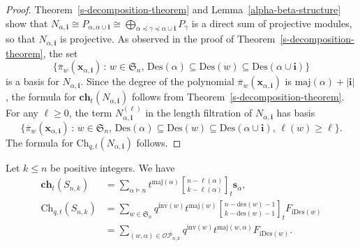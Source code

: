 \documentclass[ALCO,ThmDefs,published]{cedram}
\newcommand{\symm}{{\mathfrak{S}}}
\newcommand{\xx}{{\mathbf {x}}}
\theoremstyle{plain}
\newcommand{\maj}{{\mathrm {maj}}}
\newcommand{\inv}{{\mathrm {inv}}}
\newcommand{\Des}{{\mathrm {Des}}}
\newcommand{\des}{{\mathrm {des}}}
\newcommand{\Ch}{{\mathrm {Ch}}}
\newcommand{\ch}{{\mathbf {ch}}}
\newcommand{\iDes}{{\mathrm {iDes}}}
\newcommand{\symm}{{\mathfrak{S}}}
\newcommand{\OP}{{\mathcal{OP}}}
\newcommand{\xx}{{\mathbf {x}}}
\newcommand{\ii}{{\mathbf{i}}}
\newcommand{\sss}{{\mathbf{s}}}
\newcommand{\pib}{\overline{\pi}}
\begin{document}
\begin{proof}
Theorem~\ref{s-decomposition-theorem} and Lemma~\ref{alpha-beta-structure} show that 
$N_{\alpha,\ii} \cong P_{\alpha, \alpha \cup \ii} \cong \bigoplus_{\alpha \preceq \gamma \preceq \alpha \cup \ii} P_{\gamma}$
is a direct sum of projective modules, so that $N_{\alpha,\ii}$ is projective.
As observed in the proof of Theorem~\ref{s-decomposition-theorem},
the set 
\begin{equation*}
\{ \pib_w(\xx_{\alpha,\ii}) \,:\, w \in \symm_n, \, \Des(\alpha) \subseteq \Des(w) 
\subseteq \Des(\alpha \cup \ii) \}
\end{equation*}
is a basis for $N_{\alpha,\ii}$.  Since the degree of the polynomial $\pib_w(\xx_{\alpha,\ii})$
is $\maj(\alpha) + |\ii|$, the formula for $\ch_t(N_{\alpha,\ii})$ follows from 
Theorem~\ref{s-decomposition-theorem}.  
For any $\ell\ge0$, the term $N_{\alpha,\ii}^{(\ell)}$ in the length filtration
of $N_{\alpha,\ii}$ has basis
\begin{equation*}
\{ \pib_w(\xx_{\alpha,\ii}) \,:\, w \in \symm_n, \, \Des(\alpha) \subseteq \Des(w) 
\subseteq \Des(\alpha \cup \ii), \, \ell(w) \ge \ell \}.
\end{equation*}
The formula for $\Ch_{q,t}(N_{\alpha,\ii})$ follows.
\end{proof}

\begin{theorem}
\label{s-characteristic-theorem}
Let $k \leq n$ be positive integers.   We have
\begin{align}
\ch_t(S_{n,k}) &= \sum_{\alpha \models n} t^{\maj(\alpha)} {n - \ell(\alpha) \brack k - \ell(\alpha)}_t \sss_{\alpha}, \\
\Ch_{q,t}(S_{n,k}) &
= \sum_{w \in \symm_n} q^{\inv(w)} t^{\maj(w)} {n - \des(w) - 1 \brack k - \des(w) - 1}_t F_{\iDes(w)} \\
&= \sum_{(w,\alpha) \in \OP_{n,k}} q^{\inv(w)} t^{\maj(w,\alpha)} F_{\iDes(w)}.
\end{align}
\end{theorem}
\end{document}
